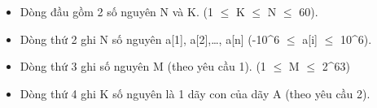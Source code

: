 \begin{itemize}
	\item     Dòng đầu gồm 2 số nguyên N và K. (1  $\le$  K  $\le$  N  $\le$  60).   
	\item     Dòng thứ 2 ghi N số nguyên a[1], a[2],…, a[n] (-10^6  $\le$  a[i]  $\le$  10^6).   
	\item     Dòng thứ 3 ghi số nguyên M (theo yêu cầu 1). (1  $\le$  M  $\le$  2^63)   
	\item     Dòng thứ 4 ghi K số nguyên là 1 dãy con của dãy A (theo yêu cầu 2).   
\end{itemize}

\